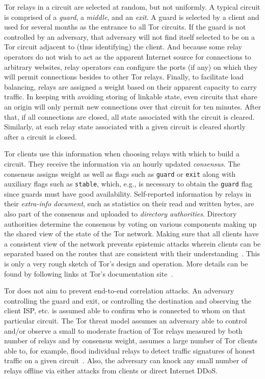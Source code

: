 Tor relays in a circuit are selected at random, but not uniformly. A typical
circuit is comprised of a \emph{guard}, a \emph{middle}, and an \emph{exit}. A
guard is selected by a client and used for several months as the entrance to all
Tor circuits. If the guard is not controlled by an adversary, that adversary
will not find itself selected to be on a Tor circuit adjacent to (thus
identifying) the client. And because some relay operators do not wish to act as
the apparent Internet source for connections to arbitrary websites, relay
operators can configure the ports (if any) on which they will permit connections
besides to other Tor relays. Finally, to facilitate load balancing, relays are
assigned a weight based on their apparent capacity to carry traffic. In keeping
with avoiding storing of linkable state, even circuits that share an origin will
only permit new connections over that circuit for ten minutes. After that, if
all connections are closed, all state associated with the circuit is cleared.
Similarly, at each relay state associated with a given circuit is cleared
shortly after a circuit is closed.

Tor clients use this information when choosing relays with which to build a
circuit. They receive the information via an hourly updated \emph{consensus}.
The consensus assigns weight as well as flags such as \texttt{guard} or
\texttt{exit} along with auxiliary flags such as \texttt{stable}, which, e.g.,
is necessary to obtain the \texttt{guard} flag since guards must have good
availability. Self-reported information by relays in their \emph{extra-info
document}, such as statistics on their read and written bytes, are also part of
the consensus and uploaded to \emph{directory authorities}. Directory
authorities determine the consensus by voting on various components making up
the shared view of the state of the Tor network. Making sure that all clients
have a consistent view of the network prevents epistemic attacks wherein clients
can be separated based on the routes that are consistent with their
understanding~\cite{danezis:pets2008}. This is only a very rough sketch of Tor's
design and operation.  More details can be found by following links at Tor's
documentation site~\cite{tor-documentation}.

Tor does not aim to prevent end-to-end correlation attacks. An adversary
controlling the guard and exit, or controlling the destination and observing the
client ISP, etc. is assumed able to confirm who is connected to whom on that
particular circuit. The Tor threat model assumes an adversary able to control
and/or observe a small to moderate fraction of Tor relays measured by both
number of relays and by consensus weight, assumes a large number of Tor clients
able to, for example, flood individual relays to detect traffic signatures of
honest traffic on a given circuit~\cite{long-paths}. Also, the adversary can
knock any small number of relays offline via either attacks from clients or
direct Internet DDoS\@. 
